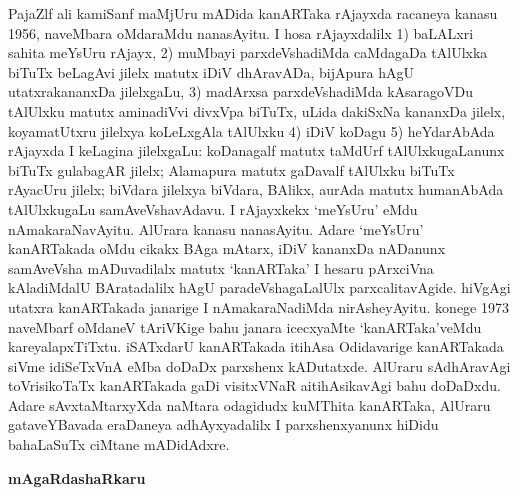 \documentclass[11pt,a4size]{article}
\begin{document}
PajaZlf ali kamiSanf maMjUru mADida kanARTaka rAjayxda racaneya kanasu
1956, naveMbara oMdaraMdu nanasAyitu. I hosa rAjayxdalilx 1) baLALxri
sahita meYsUru rAjayx, 2) muMbayi parxdeVshadiMda caMdagaDa tAlUlxka
biTuTx beLagAvi jilelx matutx iDiV dhAravADa, bijApura hAgU
utatxrakananxDa jilelxgaLu, 3) madArxsa parxdeVshadiMda kAsaragoVDu
tAlUlxku matutx aminadiVvi divxVpa biTuTx, uLida dakiSxNa kananxDa
jilelx, koyamatUtxru jilelxya koLeLxgAla tAlUlxku 4) iDiV koDagu 5)
heYdarAbAda rAjayxda I keLagina jilelxgaLu: koDanagalf matutx taMdUrf
tAlUlxkugaLanunx biTuTx gulabagAR jilelx; Alamapura matutx gaDavalf
tAlUlxku biTuTx rAyacUru jilelx; biVdara jilelxya biVdara, BAlikx,
aurAda matutx humanAbAda tAlUlxkugaLu samAveVshavAdavu. I rAjayxkekx
`meYsUru' eMdu nAmakaraNavAyitu. AlUrara kanasu nanasAyitu. Adare
`meYsUru' kanARTakada oMdu cikakx BAga mAtarx, iDiV kananxDa nADanunx
samAveVsha mADuvadilalx matutx `kanARTaka' I hesaru pArxciVna
kAladiMdalU BAratadalilx hAgU paradeVshagaLalUlx
parxcalitavAgide. hiVgAgi utatxra kanARTakada janarige I
nAmakaraNadiMda nirAsheyAyitu. konege 1973 naveMbarf oMdaneV tAriVKige
bahu janara icecxyaMte `kanARTaka'veMdu kareyalapxTiTxtu. iSATxdarU
kanARTakada itihAsa Odidavarige kanARTakada siVme idiSeTxVnA eMba
doDaDx parxshenx kADutatxde. AlUraru sAdhAravAgi toVrisikoTaTx
kanARTakada gaDi visitxVNaR aitihAsikavAgi bahu doDaDxdu. Adare
sAvxtaMtarxyXda naMtara odagidudx kuMThita kanARTaka, AlUraru
gataveYBavada eraDaneya adhAyxyadalilx I parxshenxyanunx hiDidu
bahaLaSuTx ciMtane mADidAdxre.

\bigskip
\centerline{\textbf{\Large{mAgaRdashaRkaru}}}
\medskip
\end{document}
